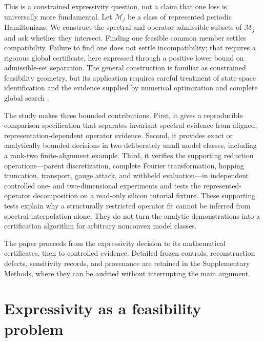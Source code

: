 \documentclass[11pt]{article}
\newcommand{\M}{\mathcal M}\newcommand{\A}{\mathcal A}\newcommand{\U}{\mathcal U}\newcommand{\HH}{\mathcal H}\newcommand{\SH}{\mathcal S_H}\newcommand{\Tr}{\operatorname{tr}}\newcommand{\dist}{\operatorname{dist}}\newcommand{\dd}{\mathrm d}
\begin{document}
This is a constrained expressivity question, not a claim that one loss is universally more fundamental. Let $\M_j$ be a class of represented periodic Hamiltonians. We construct the spectral and operator admissible subsets of $\M_j$ and ask whether they intersect. Finding one feasible common member settles compatibility. Failure to find one does not settle incompatibility; that requires a rigorous global certificate, here expressed through a positive lower bound on admissible-set separation. The general construction is familiar as constrained feasibility geometry, but its application requires careful treatment of state-space identification and the evidence supplied by numerical optimization and complete global search \cite{ljung1999,benner2015,nocedal2006,neumaier2004,moore2009}.

The study makes three bounded contributions. First, it gives a reproducible comparison specification that separates invariant spectral evidence from aligned, representation-dependent operator evidence. Second, it provides exact or analytically bounded decisions in two deliberately small model classes, including a rank-two finite-alignment example. Third, it verifies the supporting reduction operations---parent discretization, complete Fourier transformation, hopping truncation, transport, gauge attack, and withheld evaluation---in independent controlled one- and two-dimensional experiments and tests the represented-operator decomposition on a read-only silicon tutorial fixture. These supporting tests explain why a structurally restricted operator fit cannot be inferred from spectral interpolation alone. They do not turn the analytic demonstrations into a certification algorithm for arbitrary nonconvex model classes.

The paper proceeds from the expressivity decision to its mathematical certificates, then to controlled evidence. Detailed frozen controls, reconstruction defects, sensitivity records, and provenance are retained in the Supplementary Methods, where they can be audited without interrupting the main argument.

\section{Expressivity as a feasibility problem}
\end{document}
